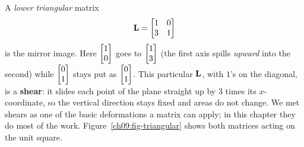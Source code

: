 A \emph{lower triangular} matrix
\[
  \mathbf{L} = \begin{bmatrix} 1 & 0 \\ 3 & 1 \end{bmatrix}
\]
is the mirror image. Here $\begin{bmatrix}1\\0\end{bmatrix}$ goes to $\begin{bmatrix}1\\3\end{bmatrix}$ (the first axis spills
\emph{upward} into the second) while $\begin{bmatrix}0\\1\end{bmatrix}$ stays put as $\begin{bmatrix}0\\1\end{bmatrix}$. This
particular $\mathbf{L}$, with $1$'s on the diagonal, is a \textbf{shear}: it slides each point
of the plane straight up by $3$ times its $x$-coordinate, so the vertical direction stays
fixed and areas do not change. We met shears as one of the basic deformations a matrix can
apply; in this chapter they do most of the work. Figure~\ref{ch09:fig-triangular} shows both
matrices acting on the unit square.

